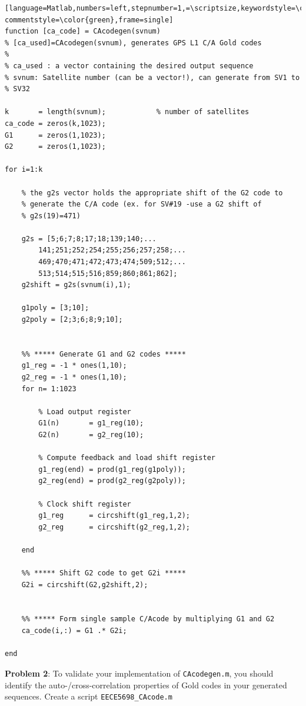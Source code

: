 \documentclass[11pt]{article}
\begin{document}
\begin{lstlisting}[language=Matlab,numbers=left,stepnumber=1,=\scriptsize,keywordstyle=\color{blue}, commentstyle=\color{green},frame=single]
function [ca_code] = CAcodegen(svnum)
% [ca_used]=CAcodegen(svnum), generates GPS L1 C/A Gold codes
%
% ca_used : a vector containing the desired output sequence
% svnum: Satellite number (can be a vector!), can generate from SV1 to
% SV32

k       = length(svnum);            % number of satellites
ca_code = zeros(k,1023);
G1      = zeros(1,1023);
G2      = zeros(1,1023);

for i=1:k
    
    % the g2s vector holds the appropriate shift of the G2 code to
    % generate the C/A code (ex. for SV#19 -use a G2 shift of
    % g2s(19)=471)
    
    g2s = [5;6;7;8;17;18;139;140;...
        141;251;252;254;255;256;257;258;...
        469;470;471;472;473;474;509;512;...
        513;514;515;516;859;860;861;862];
    g2shift = g2s(svnum(i),1);
    
    g1poly = [3;10];
    g2poly = [2;3;6;8;9;10];
    
    
    %% ***** Generate G1 and G2 codes *****
    g1_reg = -1 * ones(1,10);
    g2_reg = -1 * ones(1,10);
    for n= 1:1023
        
        % Load output register
        G1(n)       = g1_reg(10);
        G2(n)       = g2_reg(10);
        
        % Compute feedback and load shift register
        g1_reg(end) = prod(g1_reg(g1poly));
        g2_reg(end) = prod(g2_reg(g2poly));
        
        % Clock shift register
        g1_reg      = circshift(g1_reg,1,2);
        g2_reg      = circshift(g2_reg,1,2);
        
    end
    
    %% ***** Shift G2 code to get G2i *****
    G2i = circshift(G2,g2shift,2);
    
    
    %% ***** Form single sample C/Acode by multiplying G1 and G2
    ca_code(i,:) = G1 .* G2i;
    
end

\end{lstlisting}


\vspace*{.5cm}

\textbf{Problem 2}:
To validate your implementation of \verb|CAcodegen.m|, you should identify the auto-/cross-correlation properties of Gold codes in your generated sequences. 
Create a script \verb|EECE5698_CAcode.m| 
\end{document}
